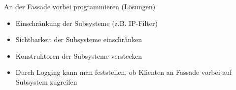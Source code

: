 \begin{frame}{An der Fassade vorbei programmieren (Lösungen)}
	\begin{itemize}
 		\item Einschränkung der Subsysteme (z.B. IP-Filter)
 		\item Sichtbarkeit der Subsysteme einschränken
 		\item Konstruktoren der Subsysteme verstecken
 		\item Durch Logging kann man feststellen, ob Klienten an Fassade vorbei auf Subsystem zugreifen
 	\end{itemize}
\end{frame}